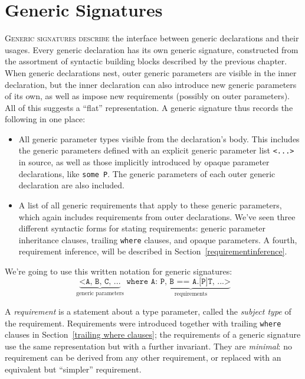 \documentclass[../generics]{subfiles}
\begin{document}
\chapter{Generic Signatures}\label{genericsig}

\lettrine{G}{eneric signatures describe} the interface between generic declarations and their usages. Every generic declaration has its own generic signature, constructed from the assortment of syntactic building blocks described by the previous chapter. When generic declarations nest, outer generic parameters are visible in the inner declaration, but the inner declaration can also introduce new generic parameters of its own, as well as impose new requirements (possibly on outer parameters). All of this suggests a ``flat'' representation. A generic signature thus records the following in one place:
\begin{itemize}
\item All generic parameter types visible from the declaration's body. This includes the generic parameters defined with an explicit generic parameter list \texttt{<...>} in source, as well as those implicitly introduced by opaque parameter declarations, like \texttt{some P}. The generic parameters of each outer generic declaration are also included.
\item A list of all generic requirements that apply to these generic parameters, which again includes requirements from outer declarations. We've seen three different syntactic forms for stating requirements: generic parameter inheritance clauses, trailing \texttt{where} clauses, and opaque parameters. A fourth, requirement inference, will be described in Section~\ref{requirementinference}.
\end{itemize}

We're going to use this written notation for generic signatures:
\[\underbrace{\texttt{<A, B, C, ...}}_{\text{generic parameters}}\texttt{ where }\underbrace{\texttt{A:\ P, B == A.[P]T, ...>}}_{\text{requirements}}\]

A \emph{requirement} is a statement about a type parameter, called the \emph{subject type} of the requirement. Requirements were introduced together with trailing \texttt{where} clauses in Section~\ref{trailing where clauses}; the requirements of a generic signature use the same representation but with a further invariant. They are \emph{minimal}: no requirement can be derived from any other requirement, or replaced with an equivalent but ``simpler'' requirement.
\end{document}
